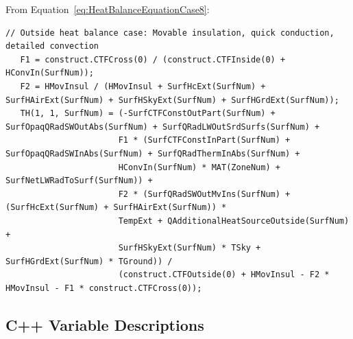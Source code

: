 From Equation~\ref{eq:HeatBalanceEquationCase8}:

\begin{lstlisting}
// Outside heat balance case: Movable insulation, quick conduction, detailed convection
   F1 = construct.CTFCross(0) / (construct.CTFInside(0) + HConvIn(SurfNum));
   F2 = HMovInsul / (HMovInsul + SurfHcExt(SurfNum) + SurfHAirExt(SurfNum) + SurfHSkyExt(SurfNum) + SurfHGrdExt(SurfNum));
   TH(1, 1, SurfNum) = (-SurfCTFConstOutPart(SurfNum) + SurfOpaqQRadSWOutAbs(SurfNum) + SurfQRadLWOutSrdSurfs(SurfNum) +
                       F1 * (SurfCTFConstInPart(SurfNum) + SurfOpaqQRadSWInAbs(SurfNum) + SurfQRadThermInAbs(SurfNum) +
                       HConvIn(SurfNum) * MAT(ZoneNum) + SurfNetLWRadToSurf(SurfNum)) +
                       F2 * (SurfQRadSWOutMvIns(SurfNum) + (SurfHcExt(SurfNum) + SurfHAirExt(SurfNum)) *
                       TempExt + QAdditionalHeatSourceOutside(SurfNum) +
                       SurfHSkyExt(SurfNum) * TSky + SurfHGrdExt(SurfNum) * TGround)) /
                       (construct.CTFOutside(0) + HMovInsul - F2 * HMovInsul - F1 * construct.CTFCross(0));
\end{lstlisting}

\subsection{C++ Variable Descriptions}\label{c++-variable-descriptions}

